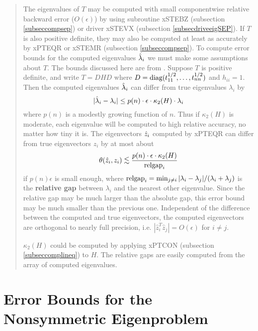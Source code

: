 \begin{quote}
The eigenvalues of $T$ may be computed with small componentwise relative
backward error
($O( \epsilon )$) by using subroutine xSTEBZ (subsection
\ref{subseccompsep})
or driver xSTEVX (subsection \ref{subsecdriveeigSEP}). If $T$ is also positive definite,
they may also be computed at least as accurately by
xPTEQR
or
xSTEMR
(subsection \ref{subseccompsep}).
To compute error bounds
for the computed eigenvalues $\hat{\lambda}_i$ we must make some assumptions
about $T$. The bounds discussed here are from \cite{barlowdemmel}.
Suppose $T$ is positive definite, and
write $T=DHD$ where $D = {\mbox {\rm diag}}( t_{11}^{1/2} , \ldots , t_{nn}^{1/2})$
and $h_{ii}= 1$.
Then the computed eigenvalues
$\hat{\lambda}_i$ can differ from true eigenvalues $\lambda_i$ by
\[
| \hat{\lambda}_i - \lambda_i | \leq p(n) \cdot \epsilon \cdot \kappa_2(H)
\cdot \lambda_i
\]
where $p(n)$ is a modestly growing function of $n$.
Thus if $\kappa_2 (H)$ is moderate, each eigenvalue will be computed
to high relative accuracy,  no matter how tiny it is.
The eigenvectors $\hat{z}_i$ computed by xPTEQR
can differ from true eigenvectors $z_i$ by
at most about
\[
\theta ( \zhat_i , z_i ) \leapproxeq \frac{p(n) \cdot \epsilon \cdot \kappa_2 (H)}
{\relgap_i}
\]
if $p(n) \epsilon$ is small enough, where
${\rm relgap}_i = \min_{j \neq i} | \lambda_i - \lambda_j |/ ( \lambda_i + \lambda_j )$
is the {\bf relative gap} between $\lambda_i$ and the nearest other eigenvalue.
Since the relative gap may be much larger than the absolute gap, this
error bound may be much smaller than the previous one.
Independent of the difference between the computed and true eigenvectors,
the computed eigenvectors are orthogonal to nearly full precision,
i.e. $| \hat{z}_i^T \hat{z}_j | = O( \epsilon )$ for $i \neq j$.

$\kappa_2 (H)$ could be computed by applying
xPTCON
(subsection \ref{subseccomplineq}) to $H$.
The relative gaps are easily computed from the
array of computed eigenvalues.

\end{quote}

\section{Error Bounds for the Nonsymmetric Eigenproblem }\label{secnonsym}

